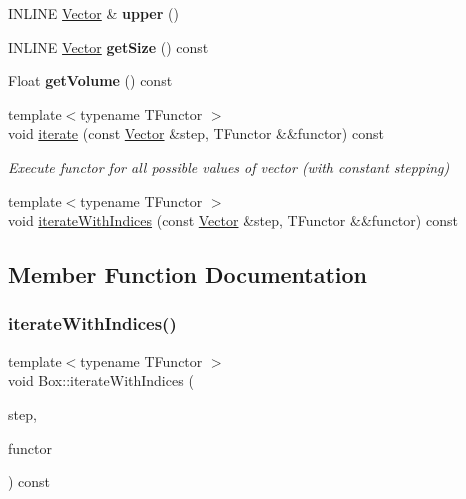 \begin{DoxyCompactItemize}
\item 
\hypertarget{classBox_aaee9e6a44373409fef03e2a2e0284d6c}{}\label{classBox_aaee9e6a44373409fef03e2a2e0284d6c} 
I\+N\+L\+I\+NE \hyperlink{classBasicVector}{Vector} \& {\bfseries upper} ()
\item 
\hypertarget{classBox_aaef966bd93d65ff36f608e9607399c46}{}\label{classBox_aaef966bd93d65ff36f608e9607399c46} 
I\+N\+L\+I\+NE \hyperlink{classBasicVector}{Vector} {\bfseries get\+Size} () const
\item 
\hypertarget{classBox_ab251a2559bbb4e6af3caddcc9aea5e1f}{}\label{classBox_ab251a2559bbb4e6af3caddcc9aea5e1f} 
Float {\bfseries get\+Volume} () const
\item 
\hypertarget{classBox_ad2e05c5df3f534141e6f7516ab17e835}{}\label{classBox_ad2e05c5df3f534141e6f7516ab17e835} 
{\footnotesize template$<$typename T\+Functor $>$ }\\void \hyperlink{classBox_ad2e05c5df3f534141e6f7516ab17e835}{iterate} (const \hyperlink{classBasicVector}{Vector} \&step, T\+Functor \&\&functor) const
\begin{DoxyCompactList}\small\item\em Execute functor for all possible values of vector (with constant stepping) \end{DoxyCompactList}\item 
{\footnotesize template$<$typename T\+Functor $>$ }\\void \hyperlink{classBox_a6802c8d00894fe5a3098e5a3d7d2184b}{iterate\+With\+Indices} (const \hyperlink{classBasicVector}{Vector} \&step, T\+Functor \&\&functor) const
\end{DoxyCompactItemize}


\subsection{Member Function Documentation}
\hypertarget{classBox_a6802c8d00894fe5a3098e5a3d7d2184b}{}\label{classBox_a6802c8d00894fe5a3098e5a3d7d2184b} 
\subsubsection{\texorpdfstring{iterate\+With\+Indices()}{iterateWithIndices()}}
{\footnotesize\ttfamily template$<$typename T\+Functor $>$ \\
void Box\+::iterate\+With\+Indices (\begin{DoxyParamCaption}\item[{const \hyperlink{classBasicVector}{Vector} \&}]{step,  }\item[{T\+Functor \&\&}]{functor }\end{DoxyParamCaption}) const\hspace{0.3cm}{\ttfamily [inline]}}

